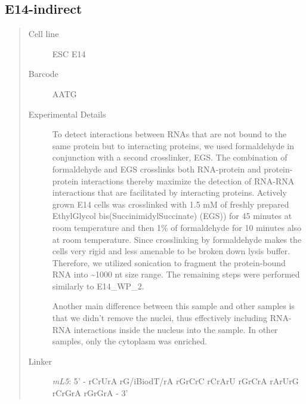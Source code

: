 \documentclass[letterpaper,10pt,english]{sphinxmanual}
\begin{document}
\subsection{E14-indirect}
\label{Data_Resources:e14-indirect}\begin{quote}\begin{description}
\item[{Cell line}] \leavevmode
ESC E14

\item[{Barcode}] \leavevmode
AATG

\item[{Experimental Details}] \leavevmode
To detect interactions between RNAs that are not bound to the same protein
but to interacting proteins, we used formaldehyde in conjunction with a second crosslinker, EGS.
The combination of formaldehyde and EGS crosslinks both RNA-protein and protein-protein
interactions thereby maximize the detection of RNA-RNA interactions that are facilitated by
interacting proteins. Actively grown E14 cells was crosslinked with 1.5 mM of freshly prepared
EthylGlycol bis(SuccinimidylSuccinate) (EGS)) for 45 minutes at room temperature and then 1\% of
formaldehyde for 10 minutes also at room temperature. Since crosslinking by formaldehyde makes
the cells very rigid and less amenable to be broken down lysis buffer. Therefore, we utilized
sonication to fragment the protein-bound RNA into \textasciitilde{}1000 nt size range. The remaining steps were
performed similarly to E14\_WP\_2.

Another main difference between this sample and other samples is that we didn't remove the nuclei,
thus effectively including RNA-RNA interactions inside the nucleus into the sample. In other
samples, only the cytoplasm was enriched.

\item[{Linker}] \leavevmode
\emph{mL5}: 5' - rCrUrA rG/iBiodT/rA rGrCrC rCrArU rGrCrA rArUrG rCrGrA rGrGrA - 3'

\end{description}\end{quote}
\end{document}
